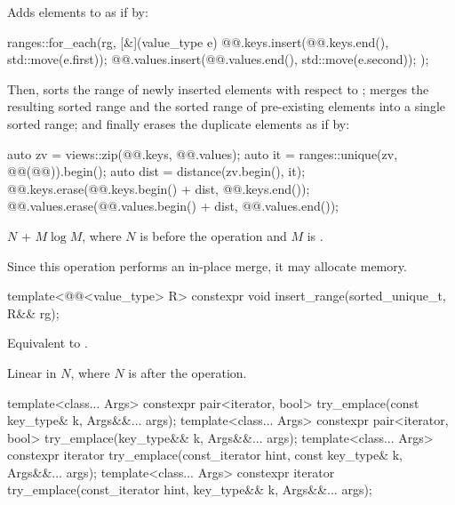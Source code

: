 \begin{itemdescr}
\pnum
\effects
Adds elements to  as if by:
\begin{codeblock}
ranges::for_each(rg, [&](value_type e) {
  @@.keys.insert(@@.keys.end(), std::move(e.first));
  @@.values.insert(@@.values.end(), std::move(e.second));
});
\end{codeblock}
Then, sorts the range of newly inserted elements
with respect to ;
merges the resulting sorted range and
the sorted range of pre-existing elements into a single sorted range; and
finally erases the duplicate elements as if by:
\begin{codeblock}
auto zv = views::zip(@@.keys, @@.values);
auto it = ranges::unique(zv, @@(@@)).begin();
auto dist = distance(zv.begin(), it);
@@.keys.erase(@@.keys.begin() + dist, @@.keys.end());
@@.values.erase(@@.values.begin() + dist, @@.values.end());
\end{codeblock}

\pnum
\complexity
$N$ + $M \log M$,
where $N$ is  before the operation and
$M$ is .

\pnum
\remarks
Since this operation performs an in-place merge, it may allocate memory.
\end{itemdescr}

%
\begin{itemdecl}
template<@@<value_type> R>
  constexpr void insert_range(sorted_unique_t, R&& rg);
\end{itemdecl}

\begin{itemdescr}
\pnum
\effects
Equivalent to .

\pnum
\complexity
Linear in $N$, where $N$ is  after the operation.
\end{itemdescr}

%
\begin{itemdecl}
template<class... Args>
  constexpr pair<iterator, bool> try_emplace(const key_type& k, Args&&... args);
template<class... Args>
  constexpr pair<iterator, bool> try_emplace(key_type&& k, Args&&... args);
template<class... Args>
  constexpr iterator try_emplace(const_iterator hint, const key_type& k, Args&&... args);
template<class... Args>
  constexpr iterator try_emplace(const_iterator hint, key_type&& k, Args&&... args);
\end{itemdecl}

